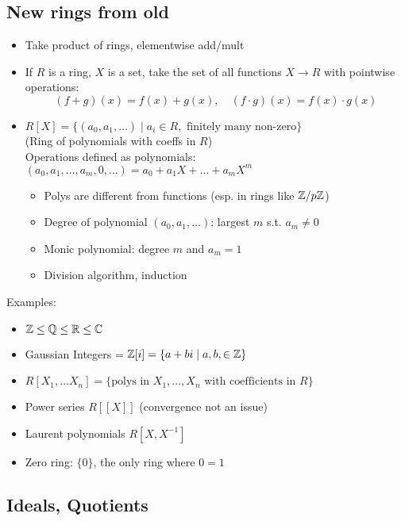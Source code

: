 \subsection*{New rings from old}
\begin{itemize}
      \item Take product of rings, elementwise add/mult
      \item If $R$ is a ring, $X$ is a set, take the set of all functions $X \to R$ with pointwise operations:
            \[(f+g)(x) = f(x) + g(x) ,\quad (f \cdot g)(x) = f(x) \cdot g(x) \]
      \item $R[X] = \{(a_0,a_1,\dots ) \mid a_i \in R, \text{ finitely many non-zero}\}$ \\
            (Ring of polynomials with coeffs in $R$)\\

            Operations defined as polynomials: $(a_0,a_1,\dots, a_m ,0 ,\dots )=a_0 + a_1X + \dots + a_m X^m$

            \begin{itemize}
                  \item Polys are different from functions (esp. in rings like $\mathbb{Z}/p\mathbb{Z}$)
                  \item Degree of polynomial $(a_0,a_1,\dots )$: largest $m$ s.t. $a_m \neq 0$
                  \item Monic polynomial: degree $m$ and $a_m=1$
                  \item Division algorithm, induction
            \end{itemize}
\end{itemize}

Examples:
\begin{itemize}
      \item $\mathbb{Z} \leq \mathbb{Q} \leq \mathbb{R} \leq \mathbb{C}$
      \item Gaussian Integers = $\mathbb{Z}[i] = \{ a + bi \mid a,b, \in \mathbb{Z}\} $
      \item $R[X_1,\dots X_n] = \{\text{polys in } X_1,...,X_n \text{ with coefficients in } R\}$
      \item Power series $R[[X]]$ (convergence not an issue)
      \item Laurent polynomials $R[X,X^{-1}]$
      \item Zero ring: $\{0\}$, the only ring where $0=1$
\end{itemize}


\subsection*{Ideals, Quotients}

